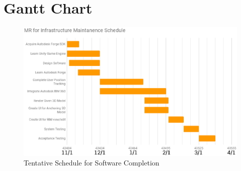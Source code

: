 \documentclass[onecolumn, draftclsnofoot,10pt, compsoc]{IEEEtran}
\begin{document}
\pagebreak
\section{Gantt Chart}
    \begin{figure}[ht]
        \centering
            \includegraphics[width=1.0\textwidth]{schedule.eps}
        \caption{Tentative Schedule for Software Completion}
    \end{figure}
\end{document}
